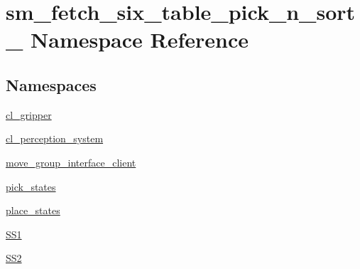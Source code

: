 \hypertarget{namespacesm__fetch__six__table__pick__n__sort__1}{}\section{sm\+\_\+fetch\+\_\+six\+\_\+table\+\_\+pick\+\_\+n\+\_\+sort\+\_ Namespace Reference}
\label{namespacesm__fetch__six__table__pick__n__sort__1}
\subsection*{Namespaces}
\begin{DoxyCompactItemize}
\item 
 \hyperlink{namespacesm__fetch__six__table__pick__n__sort__1_1_1cl__gripper}{cl\+\_\+gripper}
\item 
 \hyperlink{namespacesm__fetch__six__table__pick__n__sort__1_1_1cl__perception__system}{cl\+\_\+perception\+\_\+system}
\item 
 \hyperlink{namespacesm__fetch__six__table__pick__n__sort__1_1_1move__group__interface__client}{move\+\_\+group\+\_\+interface\+\_\+client}
\item 
 \hyperlink{namespacesm__fetch__six__table__pick__n__sort__1_1_1pick__states}{pick\+\_\+states}
\item 
 \hyperlink{namespacesm__fetch__six__table__pick__n__sort__1_1_1place__states}{place\+\_\+states}
\item 
 \hyperlink{namespacesm__fetch__six__table__pick__n__sort__1_1_1SS1}{S\+S1}
\item 
 \hyperlink{namespacesm__fetch__six__table__pick__n__sort__1_1_1SS2}{S\+S2}
\end{DoxyCompactItemize}
